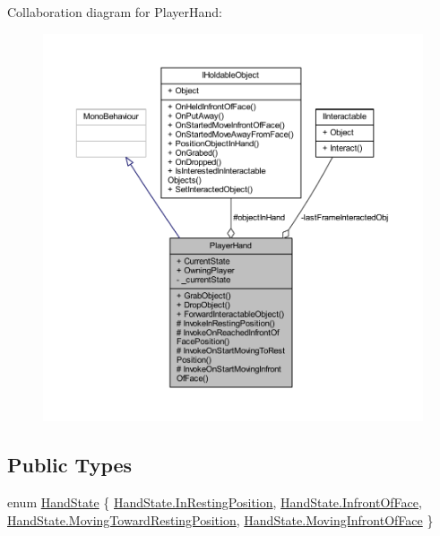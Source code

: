 Collaboration diagram for Player\+Hand\+:
\nopagebreak
\begin{figure}[H]
\begin{center}
\leavevmode
\includegraphics[width=350pt]{class_player_hand__coll__graph}
\end{center}
\end{figure}
\subsection*{Public Types}
\begin{DoxyCompactItemize}
\item 
enum \mbox{\hyperlink{class_player_hand_a1af76750da713cbc88856161d8d5ac0e}{Hand\+State}} \{ \mbox{\hyperlink{class_player_hand_a1af76750da713cbc88856161d8d5ac0eae9472019d82c6986ba42e1c6c9ddd812}{Hand\+State.\+In\+Resting\+Position}}, 
\mbox{\hyperlink{class_player_hand_a1af76750da713cbc88856161d8d5ac0ea0ffcf44fe0ab61c236ab3692a7cb3a22}{Hand\+State.\+Infront\+Of\+Face}}, 
\mbox{\hyperlink{class_player_hand_a1af76750da713cbc88856161d8d5ac0eae19d086cff66ea84fd45f01a2122af60}{Hand\+State.\+Moving\+Toward\+Resting\+Position}}, 
\mbox{\hyperlink{class_player_hand_a1af76750da713cbc88856161d8d5ac0eac9696ab2c297170cfe81d7ace9f096a6}{Hand\+State.\+Moving\+Infront\+Of\+Face}}
 \}
\end{DoxyCompactItemize}
